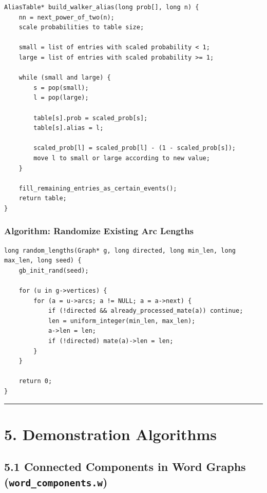 \documentclass[11pt]{article}
\begin{document}
\begin{verbatim}
AliasTable* build_walker_alias(long prob[], long n) {
    nn = next_power_of_two(n);
    scale probabilities to table size;

    small = list of entries with scaled probability < 1;
    large = list of entries with scaled probability >= 1;

    while (small and large) {
        s = pop(small);
        l = pop(large);

        table[s].prob = scaled_prob[s];
        table[s].alias = l;

        scaled_prob[l] = scaled_prob[l] - (1 - scaled_prob[s]);
        move l to small or large according to new value;
    }

    fill_remaining_entries_as_certain_events();
    return table;
}
\end{verbatim}

\subsubsection{Algorithm: Randomize Existing Arc Lengths}\label{algorithm-randomize-existing-arc-lengths}

\begin{verbatim}
long random_lengths(Graph* g, long directed, long min_len, long max_len, long seed) {
    gb_init_rand(seed);

    for (u in g->vertices) {
        for (a = u->arcs; a != NULL; a = a->next) {
            if (!directed && already_processed_mate(a)) continue;
            len = uniform_integer(min_len, max_len);
            a->len = len;
            if (!directed) mate(a)->len = len;
        }
    }

    return 0;
}
\end{verbatim}

\begin{center}\rule{0.5\linewidth}{0.5pt}\end{center}

\section{5. Demonstration Algorithms}\label{demonstration-algorithms}

\subsection{\texorpdfstring{5.1 Connected Components in Word Graphs (\texttt{word\_components.w})}{5.1 Connected Components in Word Graphs (word\_components.w)}}\label{connected-components-in-word-graphs-word_components.w}
\end{document}
